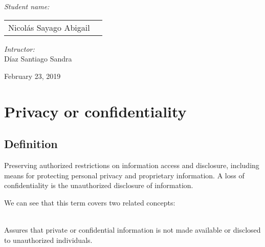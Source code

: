 \documentclass[12pt]{article}
\begin{document}
\begin{titlepage}
\begin{center}
                \noindent
                \begin{minipage}{0.5\textwidth}
                    \begin{flushleft} \large
                        \emph{Student name:}\\
                        \begin{tabular}{ll}
                        Nicolás Sayago Abigail\\
                    \end{tabular}
                    \end{flushleft}
                \end{minipage}%
                \begin{minipage}{0.5\textwidth}
                    \begin{flushright} \large
                        \emph{Intructor:} \\
                        Díaz Santiago Sandra  \\
                    \end{flushright}
                \end{minipage}
                
                \vfill
                
                {\large February 23, 2019}
            \end{center}
        \end{titlepage}
    
    \tableofcontents
    \newpage
    
    \section{Privacy or confidentiality}
    	\subsection{Definition}
    		Preserving authorized restrictions on information access and disclosure, including means for protecting personal privacy and proprietary information. A loss of confidentiality is the unauthorized disclosure of information.

    		We can see that this term covers two related concepts:

    			\\
    		Assures that private or confidential information is not made available or disclosed to unauthorized individuals.
\end{document}
